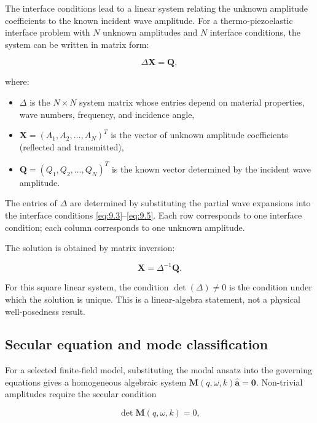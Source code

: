 The interface conditions lead to a linear system relating the unknown amplitude coefficients to the known incident wave amplitude. For a thermo-piezoelastic interface problem with $N$ unknown amplitudes and $N$ interface conditions, the system can be written in matrix form:

\begin{equation}
\Delta \bm{X} = \bm{Q},
\label{eq:9.7}
\end{equation}

where:
\begin{itemize}
\item $\Delta$ is the $N\times N$ system matrix whose entries depend on material properties, wave numbers, frequency, and incidence angle,
\item $\bm{X} = (A_1, A_2, \ldots, A_N)^T$ is the vector of unknown amplitude coefficients (reflected and transmitted),
\item $\bm{Q} = (Q_1, Q_2, \ldots, Q_N)^T$ is the known vector determined by the incident wave amplitude.
\end{itemize}

The entries of $\Delta$ are determined by substituting the partial wave expansions into the interface conditions \eqref{eq:9.3}--\eqref{eq:9.5}. Each row corresponds to one interface condition; each column corresponds to one unknown amplitude.

The solution is obtained by matrix inversion:

\begin{equation}
\bm{X} = \Delta^{-1}\bm{Q}.
\label{eq:9.8}
\end{equation}

For this square linear system, the condition $\det(\Delta) \neq 0$ is the condition under which the solution is unique. This is a linear-algebra statement, not a physical well-posedness result.

\subsection{Secular equation and mode classification}
\label{sec:9.5}

For a selected finite-field model, substituting the modal ansatz into the governing equations gives a homogeneous algebraic system $\bm{M}(q,\omega,k)\hat{\bm{a}}=\bm{0}$. Non-trivial amplitudes require the secular condition

\begin{equation}
\det \bm{M}(q,\omega,k)=0,
\label{eq:9.9}
\end{equation}

